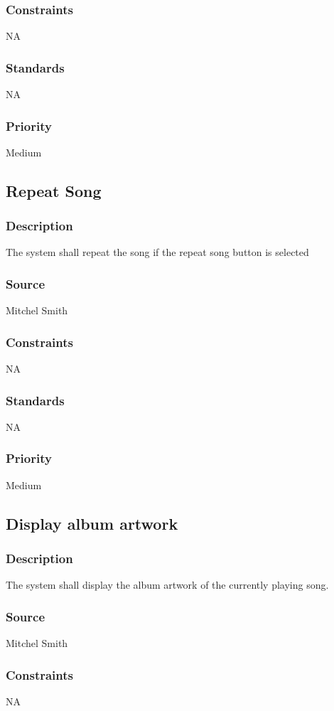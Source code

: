\subsubsection{Constraints}
NA
\subsubsection{Standards}
NA
\subsubsection{Priority}
Medium


\subsection{Repeat Song}
\subsubsection{Description}
The system shall repeat the song if the repeat song button is selected 
\subsubsection{Source}
Mitchel Smith
\subsubsection{Constraints}
NA
\subsubsection{Standards}
NA
\subsubsection{Priority}
Medium


\subsection{Display album artwork}
\subsubsection{Description}
The system shall display the album artwork of the currently playing song.
\subsubsection{Source}
Mitchel Smith
\subsubsection{Constraints}
NA
